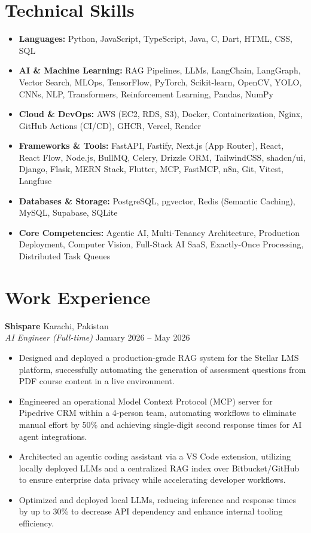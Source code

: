 \documentclass[11pt, a4paper]{article}
\begin{document}
\section*{Technical Skills}
\begin{itemize}[leftmargin=0.15in, label={}]
    \item \textbf{Languages:} Python, JavaScript, TypeScript, Java, C, Dart, HTML, CSS, SQL
    \item \textbf{AI \& Machine Learning:} RAG Pipelines, LLMs, LangChain, LangGraph, Vector Search, MLOps, TensorFlow, PyTorch, Scikit-learn, OpenCV, YOLO, CNNs, NLP, Transformers, Reinforcement Learning, Pandas, NumPy
    \item \textbf{Cloud \& DevOps:} AWS (EC2, RDS, S3), Docker, Containerization, Nginx, GitHub Actions (CI/CD), GHCR, Vercel, Render
    \item \textbf{Frameworks \& Tools:} FastAPI, Fastify, Next.js (App Router), React, React Flow, Node.js, BullMQ, Celery, Drizzle ORM, TailwindCSS, shadcn/ui, Django, Flask, MERN Stack, Flutter, MCP, FastMCP, n8n, Git, Vitest, Langfuse
    \item \textbf{Databases \& Storage:} PostgreSQL, pgvector, Redis (Semantic Caching), MySQL, Supabase, SQLite
    \item \textbf{Core Competencies:} Agentic AI, Multi-Tenancy Architecture, Production Deployment, Computer Vision, Full-Stack AI SaaS, Exactly-Once Processing, Distributed Task Queues
\end{itemize}

\section*{Work Experience}

\textbf{Shispare} \hfill Karachi, Pakistan \\
\textit{AI Engineer (Full-time)} \hfill January 2026 -- May 2026
\begin{itemize}[leftmargin=0.25in, itemsep=2pt]
    \item Designed and deployed a production-grade RAG system for the Stellar LMS platform, successfully automating the generation of assessment questions from PDF course content in a live environment.
    \item Engineered an operational Model Context Protocol (MCP) server for Pipedrive CRM within a 4-person team, automating workflows to eliminate manual effort by 50\% and achieving single-digit second response times for AI agent integrations.
    \item Architected an agentic coding assistant via a VS Code extension, utilizing locally deployed LLMs and a centralized RAG index over Bitbucket/GitHub to ensure enterprise data privacy while accelerating developer workflows.
    \item Optimized and deployed local LLMs, reducing inference and response times by up to 30\% to decrease API dependency and enhance internal tooling efficiency.
\end{itemize}
\end{document}
